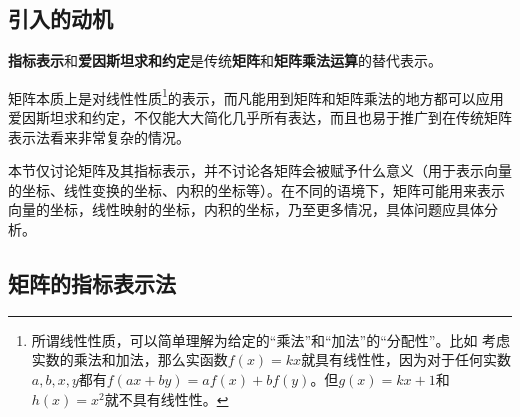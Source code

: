 





\subsection{引入的动机}


\textbf{指标表示}和\textbf{爱因斯坦求和约定}是传统\textbf{矩阵}和\textbf{矩阵乘法运算}的替代表示。

矩阵本质上是对线性性质\footnote{所谓线性性质，可以简单理解为给定的“乘法”和“加法”的“分配性”。比如
考虑实数的乘法和加法，那么实函数$f(x)=kx$就具有线性性，因为对于任何实数$a, b, x, y$都有$f(ax+by)=af(x)+bf(y)$。但$g(x)=kx+1$和$h(x)=x^2$就不具有线性性。}的表示，而凡能用到矩阵和矩阵乘法的地方都可以应用爱因斯坦求和约定，不仅能大大简化几乎所有表达，而且也易于推广到在传统矩阵表示法看来非常复杂的情况。

本节仅讨论矩阵及其指标表示，并不讨论各矩阵会被赋予什么意义（用于表示向量的坐标、线性变换的坐标、内积的坐标等）。在不同的语境下，矩阵可能用来表示向量的坐标，线性映射的坐标，内积的坐标，乃至更多情况，具体问题应具体分析。





\subsection{矩阵的指标表示法}



